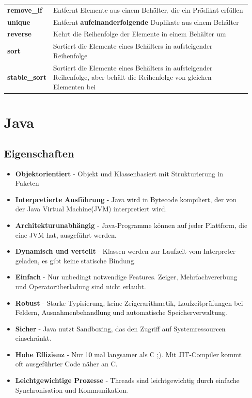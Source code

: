 \documentclass[12pt]{scrartcl}
\begin{document}
\begin{table}[H]
\begin{tabular}{ p{4cm} | p{11cm} }
		\textbf{remove\_if}   & Entfernt Elemente aus einem Behälter, die ein Prädikat erfüllen                                                            \\
		\textbf{unique}       & Entfernt \textbf{aufeinanderfolgende} Duplikate aus einem Behälter                                                         \\
		\textbf{reverse}      & Kehrt die Reihenfolge der Elemente in einem Behälter um                                                                    \\
		\textbf{sort}         & Sortiert die Elemente eines Behälters in aufsteigender Reihenfolge                                                         \\
		\textbf{stable\_sort} & Sortiert die Elemente eines Behälters in aufsteigender Reihenfolge, aber behält die Reihenfolge von gleichen Elementen bei
	\end{tabular}
\end{table}
\pagebreak

\section{Java}

\subsection{Eigenschaften}

\begin{itemize}
	\item \textbf{Objektorientiert} - Objekt und Klassenbasiert mit Strukturierung in Paketen
	\item \textbf{Interpretierte Ausführung} - Java wird in Bytecode kompiliert, der von der Java Virtual Machine(JVM) interpretiert wird.
	\item \textbf{Architekturunabhängig} - Java-Programme können auf jeder Plattform, die eine JVM hat, ausgeführt werden.
	\item \textbf{Dynamisch und verteilt} - Klassen werden zur Laufzeit vom Interpreter geladen, es gibt keine statische Bindung.
	\item \textbf{Einfach} - Nur unbedingt notwendige Features. Zeiger, Mehrfachvererbung und Operatorüberladung sind nicht erlaubt.
	\item \textbf{Robust} - Starke Typisierung, keine Zeigerarithmetik, Laufzeitprüfungen bei Feldern, Ausnahmenbehandlung und automatische Speicherverwaltung.
	\item \textbf{Sicher} - Java nutzt Sandboxing, das den Zugriff auf Systemressourcen einschränkt.
	\item \textbf{Hohe Effizienz} - Nur 10 mal langsamer als C ;). Mit JIT-Compiler kommt oft ausgeführter Code näher an C.
	\item \textbf{Leichtgewichtige Prozesse} - Threads sind leichtgewichtig durch einfache Synchronisation und Kommunikation.
\end{itemize}
\end{document}
